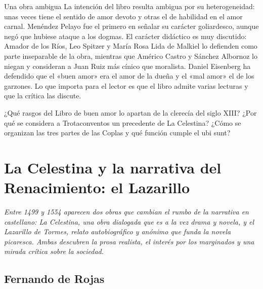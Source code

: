 \documentclass{book}
\begin{document}
\begin{tcolorbox}[title={Autoficha}, studiumcheck, breakable]

Una obra ambigua
La intención del libro resulta ambigua por su heterogeneidad: unas veces tiene el sentido de amor devoto y otras el de habilidad en el amor carnal. Menéndez Pelayo fue el primero en señalar su carácter goliardesco, aunque negó que hubiese ataque a los dogmas. El carácter didáctico es muy discutido: Amador de los Ríos, Leo Spitzer y María Rosa Lida de Malkiel lo defienden como parte inseparable de la obra, mientras que Américo Castro y Sánchez Albornoz lo niegan y consideran a Juan Ruiz más cínico que moralista. Daniel Eisenberg ha defendido que el «buen amor» era el amor de la dueña y el «mal amor» el de los garzones. Lo que importa para el lector es que el libro admite varias lecturas y que la crítica las discute.


¿Qué rasgos del Libro de buen amor lo apartan de la clerecía del siglo XIII? ¿Por qué se considera a Trotaconventos un precedente de La Celestina? ¿Cómo se organizan las tres partes de las Coplas y qué función cumple el ubi sunt?

\end{tcolorbox}

\chapter{La Celestina y la narrativa del Renacimiento: el Lazarillo}
\label{chap:lit-04}

\noindent\textit{Entre 1499 y 1554 aparecen dos obras que cambian el rumbo de la narrativa en castellano: La Celestina, una obra dialogada que es a la vez drama y novela, y el Lazarillo de Tormes, relato autobiográfico y anónimo que funda la novela picaresca. Ambas descubren la prosa realista, el interés por los marginados y una mirada crítica sobre la sociedad.}


\section{Fernando de Rojas}
\end{document}
